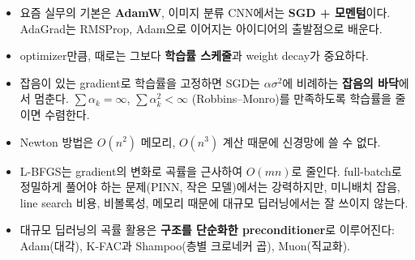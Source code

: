 \documentclass[11pt,a4paper]{article}
\begin{document}
\begin{keybox}[부록 정리]
\begin{itemize}[leftmargin=1.5em]
\item 요즘 실무의 기본은 \textbf{AdamW}, 이미지 분류 CNN에서는 \textbf{SGD + 모멘텀}이다.
AdaGrad는 RMSProp, Adam으로 이어지는 아이디어의 출발점으로 배운다.
\item optimizer만큼, 때로는 그보다 \textbf{학습률 스케줄}과 weight decay가 중요하다.
\item 잡음이 있는 gradient로 학습률을 고정하면 SGD는 $\alpha\sigma^2$에 비례하는 \textbf{잡음의 바닥}에서 멈춘다.
$\sum\alpha_k=\infty$, $\sum\alpha_k^2<\infty$ (Robbins--Monro)를 만족하도록 학습률을 줄이면 수렴한다.
\item Newton 방법은 $O(n^2)$ 메모리, $O(n^3)$ 계산 때문에 신경망에 쓸 수 없다.
\item L-BFGS는 gradient의 변화로 곡률을 근사하여 $O(mn)$로 줄인다.
full-batch로 정밀하게 풀어야 하는 문제(PINN, 작은 모델)에서는 강력하지만,
미니배치 잡음, line search 비용, 비볼록성, 메모리 때문에 대규모 딥러닝에서는 잘 쓰이지 않는다.
\item 대규모 딥러닝의 곡률 활용은 \textbf{구조를 단순화한 preconditioner}로 이루어진다:
Adam(대각), K-FAC과 Shampoo(층별 크로네커 곱), Muon(직교화).
\end{itemize}
\end{keybox}
\end{document}
